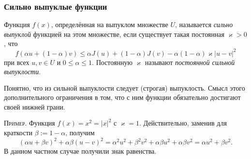 \subsubsection{Сильно выпуклые функции}
\begin{definition}
  Функция $ f(x) $, определённая на выпуклом множестве $ U $, называется
  \emph{сильно выпуклой} функцией на этом множестве, если существует такая
  постоянная $ \varkappa > 0$, что 
  \[
      f(\alpha u + (1-\alpha)v) \leqslant \alpha J(u) + (1-\alpha)J(v) -
      \alpha(1-\alpha)\varkappa|u-v|^2
  \]
 при всех $ u, v \in U $ и $ 0\leqslant \alpha \leqslant 1 $. Постоянную $
 \varkappa $ называют \emph{постоянной сильной выпуклости}. 
\end{definition}
Понятно, что из сильной выпуклости следует (строгая) выпуклость. Смысл этого
дополнительного ограничения в том, что с ним функции обязательно достигают своей
нижней грани.

\textsc{Пример.} Функция $ f(x) = x^2 = |x|^2 $ с $ \varkappa = 1 $.
Действительно, заменив для краткости $ \beta := 1- \alpha $, получим
\[
  (\alpha u + \beta v)^2 + \alpha \beta (u -v)^2 = \alpha^2 u^2 + \beta^2 v^2 +
  \alpha\beta u^2 + \alpha \beta v^2= \alpha u^2 + \beta v^2.
\]
В данном частном случае получили знак равенства.

